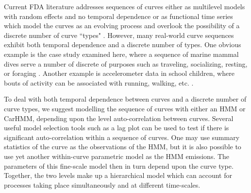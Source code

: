 

Current FDA literature addresses sequences of curves either as multilevel models with random effects and no temporal dependence \citep{chen:2012,di:2009} or as functional time series which model the curves as an evolving process and overlook the possibility of a discrete number of curve ``types" \citep{Kokoszka:2018}. However, many real-world curve sequences exhibit both temporal dependence and a discrete number of types. One obvious example is the case study examined here, where a sequence of marine mammal dives serve a number of discrete of purposes such as traveling, socializing, resting, or foraging \citep{Tennessen:2019a}. Another example is accelerometer data in school children, where bouts of activity can be associated with running, walking, etc. \citep{Morris:2007}.

To deal with both temporal dependence between curves and a discrete number of curve types, we suggest modelling the sequence of curves with either an HMM or CarHMM, depending upon the level auto-correlation between curves. Several useful model selection tools such as a lag plot can be used to test if there is significant auto-correlation within a sequence of curves. One may use summary statistics of the curve as the observations of the HMM, but it is also possible to use yet another within-curve parametric model as the HMM emissions. The parameters of this fine-scale model then in turn depend upon the curve type. Together, the two levels make up a hierarchical model which can account for processes taking place simultaneously and at different time-scales.



